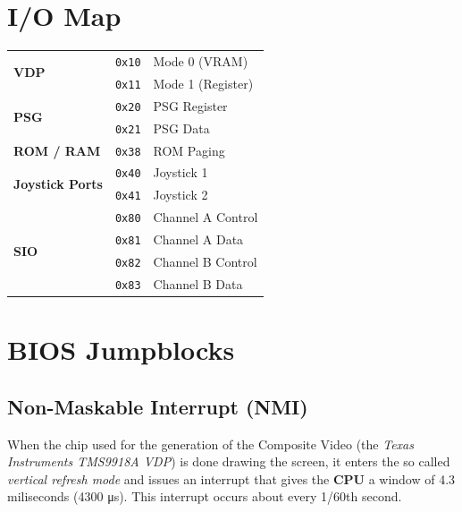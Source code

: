 \documentclass[a4paper,11pt]{article}
\begin{document}
    \pagebreak
    \section{I/O Map}

    \begin{tabular}{l l l }
        \hline
        \multirow{2}{*}{\textbf{VDP}} & \texttt{0x10} & Mode 0 (VRAM)\\
        & \texttt{0x11} & Mode 1 (Register)\\
        \hline
        \multirow{2}{*}{\textbf{PSG}} & \texttt{0x20} & PSG Register\\
        & \texttt{0x21} & PSG Data\\
        \hline
        \textbf{ROM / RAM} & \texttt{0x38} & ROM Paging\\
        \hline
        \multirow{2}{*}{\textbf{Joystick Ports}} & \texttt{0x40} 
        & Joystick 1\\
        & \texttt{0x41} & Joystick 2\\
        \hline
        \multirow{4}{*}{\textbf{SIO}} & \texttt{0x80} & Channel A Control\\
        & \texttt{0x81} & Channel A Data\\
        & \texttt{0x82} & Channel B Control\\
        & \texttt{0x83} & Channel B Data\\
        \hline
    \end{tabular}

    \pagebreak
    \section{BIOS Jumpblocks}

    \subsection{Non-Maskable Interrupt (NMI)}
    \label{sec:nmi}

    When the chip used for the generation of the Composite Video (the \textit{Texas
    Instruments TMS9918A VDP}) is done drawing the screen, it enters the so
    called \textit{vertical refresh mode} and issues an interrupt that gives the
    \textbf{CPU} a window of 4.3 miliseconds (4300 \si{\micro\second}). This
    interrupt occurs about every 1/60th second.
\end{document}
